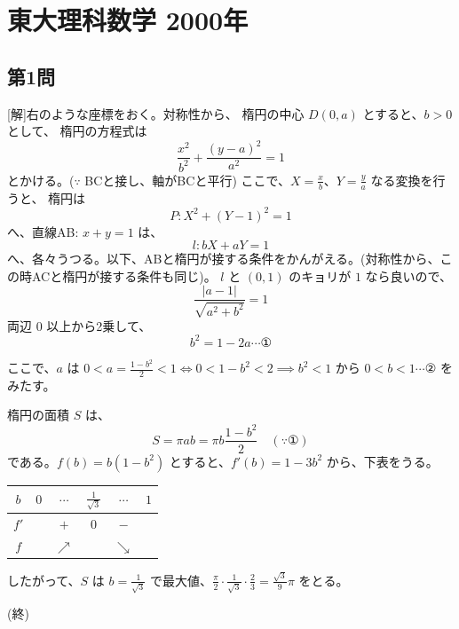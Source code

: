 \documentclass[../main.tex]{subfiles}
\begin{document}
\section*{東大理科数学 2000年}

\subsection*{第1問}
[解]右のような座標をおく。対称性から、
楕円の中心 $D(0,a)$ とすると、$b>0$ として、
楕円の方程式は
\[ \frac{x^2}{b^2} + \frac{(y-a)^2}{a^2} = 1 \]
とかける。($\because$ BCと接し、軸がBCと平行) ここで、$X=\frac{x}{b}$、$Y=\frac{y}{a}$ なる変換を行うと、
楕円は
\[ P : X^2 + (Y-1)^2 = 1 \]
へ、直線AB: $x+y=1$ は、
\[ l : bX + aY = 1 \]
へ、各々うつる。以下、ABと楕円が接する条件をかんがえる。(対称性から、この時ACと楕円が接する条件も同じ)。
$l$ と $(0,1)$ のキョリが $1$ なら良いので、
\[ \frac{|a-1|}{\sqrt{a^2+b^2}} = 1 \]
両辺 $0$ 以上から2乗して、
\[ b^2 = 1 - 2a \cdots \text{①} \]

ここで、$a$ は $0 < a = \frac{1-b^2}{2} < 1 \iff 0 < 1-b^2 < 2 \implies b^2 < 1$ から
$0 < b < 1 \cdots \text{②}$ をみたす。

楕円の面積 $S$ は、
\[ S = \pi a b = \pi b \frac{1-b^2}{2} \quad (\because \text{①}) \]
である。$f(b) = b(1-b^2)$ とすると、$f'(b) = 1 - 3b^2$ から、下表をうる。

\begin{center}
  \begin{tabular}{|c|c|c|c|c|c|}
    \hline
    $b$ & $0$ & $\cdots$ & $\frac{1}{\sqrt{3}}$ & $\cdots$ & $1$ \\
    \hline
    $f'$ & & $+$ & $0$ & $-$ & \\
    \hline
    $f$ & & $\nearrow$ & & $\searrow$ & \\
    \hline
  \end{tabular}
\end{center}

したがって、$S$ は $b = \frac{1}{\sqrt{3}}$ で最大値、$\frac{\pi}{2} \cdot \frac{1}{\sqrt{3}} \cdot \frac{2}{3} = \frac{\sqrt{3}}{9}\pi$ をとる。
\begin{flushright}
  (終)
\end{flushright}

\begin{center}
\end{center}
\end{document}
